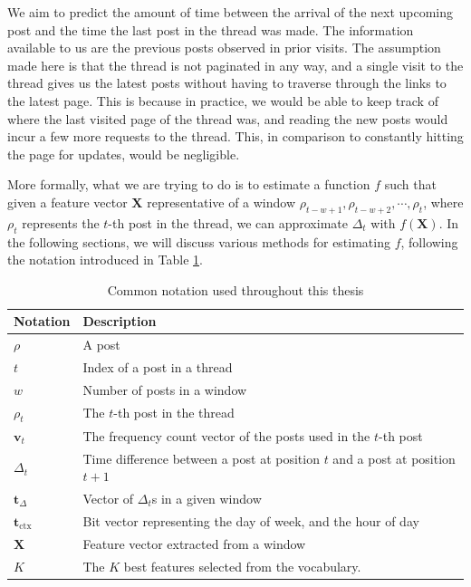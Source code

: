 \newcommand{\vocab}{\mathbf{v}}
\newcommand{\dtvec}{\mathbf{t}_\Delta}
\newcommand{\ctxvec}{\mathbf{t}_\text{ctx}}
\newcommand{\dt}{\Delta_t}
\newcommand{\prerror}{Pr_{error}}
\newcommand{\weights}{\mathbf{w}}
\newcommand{\X}{\mathbf{X}}
\newcommand{\post}{\rho}
\renewcommand{\t}{t}
\newcommand{\w}{w}


We aim to predict the amount of time between the arrival of the next upcoming 
post and the time the last post in the thread was made. The information 
available to us are the previous posts observed in prior visits.  The assumption 
made here is that the thread is not paginated in any way, and a single visit to 
the thread gives us the latest posts without having to traverse through the 
links to the latest page. This is because in practice, we would be able to keep 
track of where the last visited page of the thread was, and reading the new 
posts would incur a few more requests to the thread. This, in comparison to 
constantly hitting the page for updates, would be negligible.

More formally, what we are trying to do is to estimate a function $f$ such that 
given a feature vector $\X$ representative of a window $\post_{t - w + 
1},\post_{t - w + 2},\cdots ,\post_t$, where $\post_t$ represents the $t$-th 
post in the thread, we can approximate $\dt$ with $f(\X)$.  In the following 
sections, we will discuss various methods for estimating $f$, following the notation introduced in Table \ref{table:notations}.

\begin{table}
	\begin{center}
	\begin{tabular}{l l}
	\hline
Notation	&	Description\\
	\hline
$\post$		&	A post\\
$\t$		&	Index of a post in a thread\\
$\w$		&	Number of posts in a window  \\
$\post_\t$	&	The $t$-th post in the thread\\
$\vocab_\t$	&	The frequency count vector of the posts used in the $t$-th 
	post\\
$\dt$		&	Time difference between a post at position $\t$ and a post at 
	position $\t+1$ \\
$\dtvec$	&	Vector of $\dt$s in a given window\\
$\ctxvec$	&	Bit vector representing the day of week, and the hour of day\\
$\X$		&	Feature vector extracted from a window\\
$K$			&	The $K$ best features selected from the vocabulary.\\
	\hline
	\end{tabular}
\end{center}
\caption{Common notation used throughout this thesis} \label{table:notations}
\end{table}

